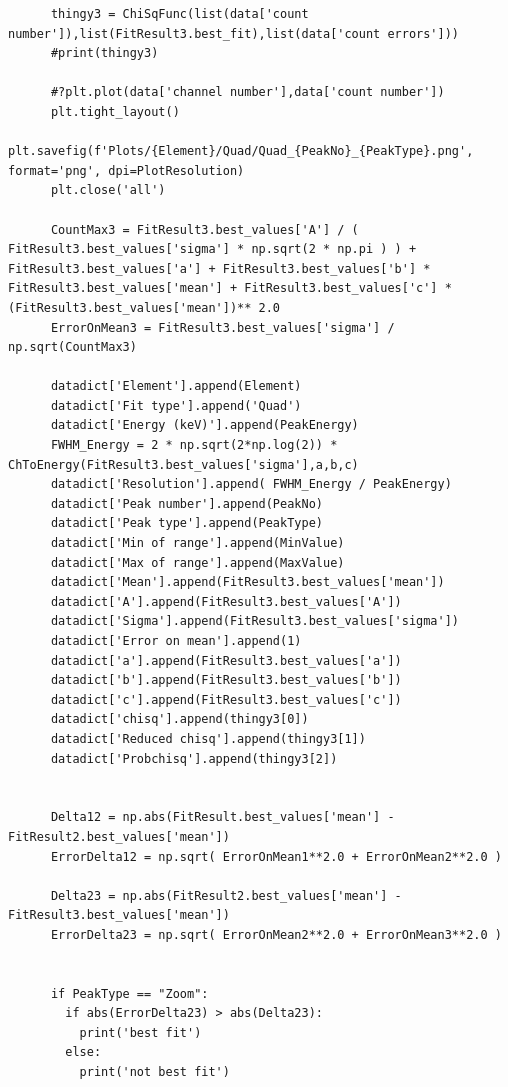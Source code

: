 \documentclass[11pt,a4paper]{article}
\begin{document}
\begin{verbatim}
      thingy3 = ChiSqFunc(list(data['count number']),list(FitResult3.best_fit),list(data['count errors']))
      #print(thingy3)

      #?plt.plot(data['channel number'],data['count number'])
      plt.tight_layout()
      plt.savefig(f'Plots/{Element}/Quad/Quad_{PeakNo}_{PeakType}.png', format='png', dpi=PlotResolution)
      plt.close('all')

      CountMax3 = FitResult3.best_values['A'] / ( FitResult3.best_values['sigma'] * np.sqrt(2 * np.pi ) ) + FitResult3.best_values['a'] + FitResult3.best_values['b'] * FitResult3.best_values['mean'] + FitResult3.best_values['c'] * (FitResult3.best_values['mean'])** 2.0
      ErrorOnMean3 = FitResult3.best_values['sigma'] / np.sqrt(CountMax3)

      datadict['Element'].append(Element)
      datadict['Fit type'].append('Quad')
      datadict['Energy (keV)'].append(PeakEnergy)
      FWHM_Energy = 2 * np.sqrt(2*np.log(2)) * ChToEnergy(FitResult3.best_values['sigma'],a,b,c)
      datadict['Resolution'].append( FWHM_Energy / PeakEnergy)
      datadict['Peak number'].append(PeakNo)
      datadict['Peak type'].append(PeakType)
      datadict['Min of range'].append(MinValue)
      datadict['Max of range'].append(MaxValue)
      datadict['Mean'].append(FitResult3.best_values['mean'])
      datadict['A'].append(FitResult3.best_values['A'])
      datadict['Sigma'].append(FitResult3.best_values['sigma'])
      datadict['Error on mean'].append(1)
      datadict['a'].append(FitResult3.best_values['a'])
      datadict['b'].append(FitResult3.best_values['b'])
      datadict['c'].append(FitResult3.best_values['c'])
      datadict['chisq'].append(thingy3[0])
      datadict['Reduced chisq'].append(thingy3[1])
      datadict['Probchisq'].append(thingy3[2])
      

      Delta12 = np.abs(FitResult.best_values['mean'] - FitResult2.best_values['mean'])
      ErrorDelta12 = np.sqrt( ErrorOnMean1**2.0 + ErrorOnMean2**2.0 )

      Delta23 = np.abs(FitResult2.best_values['mean'] - FitResult3.best_values['mean'])
      ErrorDelta23 = np.sqrt( ErrorOnMean2**2.0 + ErrorOnMean3**2.0 )


      if PeakType == "Zoom":
        if abs(ErrorDelta23) > abs(Delta23):
          print('best fit')
        else:
          print('not best fit')
            

\end{verbatim}
\end{document}
